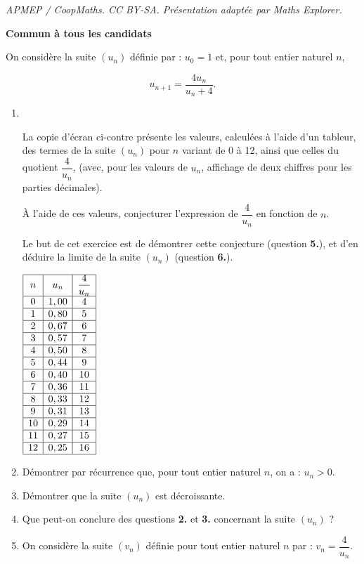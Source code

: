\documentclass[10pt]{article}
\begin{document}
\noindent\textit{APMEP / CoopMaths. CC BY-SA. Présentation adaptée par Maths Explorer.}\par\medskip
\textbf{Commun à tous les candidats}

\medskip

On considère la suite $\left(u_n\right)$ définie par : $u_0 = 1$ et, pour tout entier naturel $n$,

\[ u_{n+1}  = \dfrac{4u_n}{u_n + 4}.\]

\smallskip

\begin{enumerate}
\item ~

\parbox{0.7\linewidth}{
La copie d'écran ci-contre présente les valeurs, calculées à l'aide d'un tableur, des
termes de la suite $\left(u_n\right)$ pour $n$ variant de 0 à 12, ainsi que celles du quotient 
$\dfrac{4}{u_n}$,  (avec, pour les valeurs de $u_n$, affichage de deux
chiffres pour les parties décimales).

À l'aide de ces valeurs, conjecturer l'expression de $\dfrac{4}{u_n}$  en fonction de $n$.

Le but de cet exercice est de démontrer cette conjecture (question \textbf{5.}), et d'en déduire la limite de la suite $\left(u_n\right)$ (question \textbf{6.}).}\hfill
\parbox{0.25\linewidth}{
$\begin{array}{|*{3}{c|}}\hline
n&u_n&\dfrac{4}{u_n}\\ \hline
0 &1,00 &4\\ \hline
1 &0,80 &5\\ \hline
2 &0,67 &6\\ \hline
3 &0,57 &7\\ \hline
4 &0,50 &8\\ \hline
5 &0,44 &9\\ \hline
6 &0,40 &10\\ \hline
7 &0,36 &11\\ \hline
8 &0,33 &12\\ \hline
9 &0,31 &13\\ \hline
10 &0,29& 14 \\ \hline
11 &0,27& 15 \\ \hline
12 &0,25 &16\\ \hline
\end{array}$}

\item Démontrer par récurrence que, pour tout entier naturel $n$, on a : $u_n > 0$.
\item Démontrer que la suite $\left(u_n\right)$ est décroissante.
\item Que peut-on conclure des questions \textbf{2.} et \textbf{3.} concernant la suite $\left(u_n\right)$ ?
\item On considère la suite $\left(v_n\right)$ définie pour tout entier naturel $n$ par : $v_n = \dfrac{4}{u_n}$.


\end{enumerate}
\end{document}
